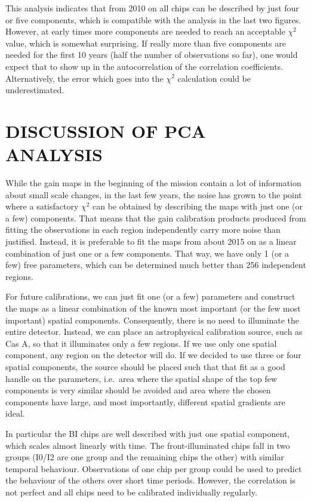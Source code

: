 \documentclass[]{spie}  %
\begin{document}
This analysis indicates that from 2010 on all chips can be described by just four or five components, which is compatible with the analysis in the last two figures. However, at early times more components are needed to reach an acceptable $\chi^2$ value, which is somewhat surprising. If really more than five components are needed for the first 10 years (half the number of observations so far), one would expect that to show up in the autocorrelation of the correlation coefficients. Alternatively, the error which goes into the $\chi^2$ calculation could be underestimated.

\section{DISCUSSION OF PCA ANALYSIS}
While the gain maps in the beginning of the mission contain a lot of information about small scale changes, in the last few years, the noise has grown to the point where a satisfactory $\chi^2$ can be obtained by describing the  maps with just one (or a few) components. That means that the gain calibration products produced from fitting the observations in each region independently carry more noise than justified. Instead, it is preferable to fit the maps from about 2015 on as a linear combination of just one or a few components. That way, we have only 1 (or a few) free parameters, which can be determined much better than 256 independent regions.

For future calibrations, we can just fit one (or a few) parameters and construct the maps as a linear combination of the known most important (or the few most important) spatial components. Consequently, there is no need to illuminate the entire detector. Instead, we can place an astrophysical calibration source, such as Cas A, so that it illuminates only a few regions. If we use only one spatial component, any region on the detector will do. If we decided to use three or four spatial components, the source should be placed such that that fit as a good handle on the parameters, i.e.\ area where the spatial shape of the top few components is very similar should be avoided and area where the chosen components have large, and most importantly, different spatial gradients are ideal.

In particular the BI chips are well described with just one spatial component, which scales  almost linearly with time. The front-illuminated chips fall in two groups (I0/I2 are one group and the remaining chips the other) with similar temporal behaviour. Observations of one chip per group could be used to predict the behaviour of the others over short time periods. However, the correlation is not perfect and all chips need to be calibrated individually regularly.
\end{document}
